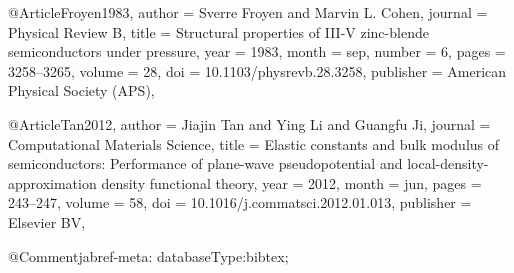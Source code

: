 @Article{Froyen1983,
  author    = {Sverre Froyen and Marvin L. Cohen},
  journal   = {Physical Review B},
  title     = {Structural properties of {III}-V zinc-blende semiconductors under pressure},
  year      = {1983},
  month     = {sep},
  number    = {6},
  pages     = {3258--3265},
  volume    = {28},
  doi       = {10.1103/physrevb.28.3258},
  publisher = {American Physical Society ({APS})},
}

@Article{Tan2012,
  author    = {Jiajin Tan and Ying Li and Guangfu Ji},
  journal   = {Computational Materials Science},
  title     = {Elastic constants and bulk modulus of semiconductors: Performance of plane-wave pseudopotential and local-density-approximation density functional theory},
  year      = {2012},
  month     = {jun},
  pages     = {243--247},
  volume    = {58},
  doi       = {10.1016/j.commatsci.2012.01.013},
  publisher = {Elsevier {BV}},
}

@Comment{jabref-meta: databaseType:bibtex;}

